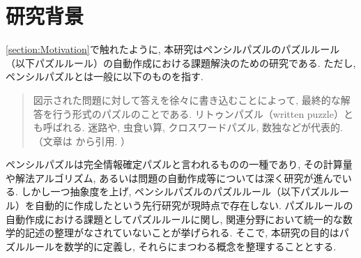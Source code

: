 \section{研究背景}\label{section:Introduction}

\cref{section:Motivation}で触れたように, 本研究はペンシルパズルのパズルルール（以下パズルルール）の自動作成における課題解決のための研究である. ただし, ペンシルパズルとは一般に以下のものを指す.
\begin{quote}
  図示された問題に対して答えを徐々に書き込むことによって, 最終的な解答を行う形式のパズルのことである. リトゥンパズル（written puzzle）とも呼ばれる. 迷路や, 虫食い算, クロスワードパズル, 数独などが代表的. （文章は \cite{web:PencilPuzzle}から引用. ）
\end{quote}
ペンシルパズルは完全情報確定パズルと言われるものの一種であり, その計算量や解法アルゴリズム, あるいは問題の自動作成等については深く研究が進んでいる. しかし一つ抽象度を上げ, ペンシルパズルのパズルルール（以下パズルルール）を自動的に作成したという先行研究が現時点で存在しない.
パズルルールの自動作成における課題としてパズルルールに関し, 関連分野において統一的な数学的記述の整理がなされていないことが挙げられる. そこで, 本研究の目的はパズルルールを数学的に定義し, それらにまつわる概念を整理することとする.

